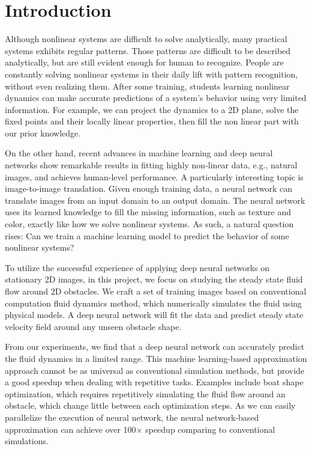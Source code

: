 \section{Introduction}

Although nonlinear systems are difficult to solve analytically, many practical 
systems exhibits regular patterns. 
Those patterns are difficult to be described analytically, but are still 
evident 
enough for human to recognize. 
People are constantly solving nonlinear systems in their daily lift with 
pattern 
recognition, without even realizing them. 
After some training, students learning nonlinear dynamics can make accurate 
predictions of a system's behavior using very limited information. 
For example, we can project the dynamics to a 2D plane, solve the fixed points 
and their locally linear properties, then fill the non linear part with our 
prior knowledge.

On the other hand, recent advances in machine learning and deep neural networks 
show remarkable results in fitting highly non-linear data, e.g., natural 
images, 
and achieves human-level performance. 
A particularly interesting topic is image-to-image translation.
Given enough training data, a neural network can translate images from an input 
domain to an output domain. 
The neural network uses its learned knowledge to fill the missing information, 
such as texture and color, exactly like how we solve nonlinear systems. 
As such, a natural question rises:
Can we train a machine learning model to predict the behavior of some nonlinear 
systems? 

To utilize the successful experience of applying deep neural networks on 
stationary 2D images, in this project, we focus on studying the steady state 
fluid flow around 2D obstacles.  
We craft a set of training images based on conventional computation fluid 
dynamics method, which numerically simulates the fluid using physical models. 
A deep neural network will fit the data and predict steady state velocity field 
around any unseen obstacle shape.  

From our experiments, we find that a deep neural network can accurately predict 
the fluid dynamics in a limited range. 
This machine learning-based approximation approach cannot be as universal as 
conventional simulation methods, but provide a good speedup when dealing with 
repetitive tasks. 
Examples include boat shape optimization, which requires repetitively 
simulating 
the fluid flow around an obstacle, which change little between each 
optimization 
steps. 
As we can easily parallelize the execution of neural network, the neural 
network-based approximation can achieve over 100$\times$ speedup comparing to 
conventional simulations. 

